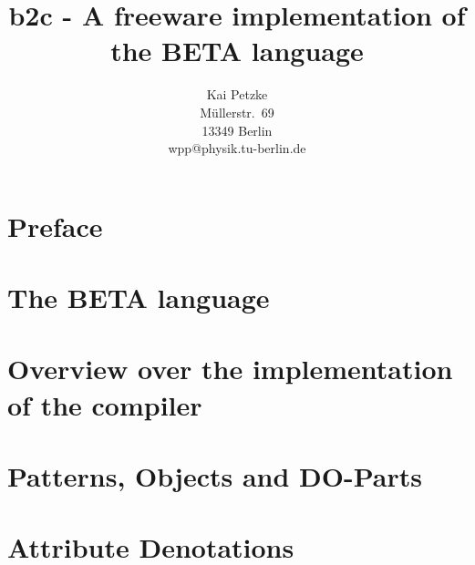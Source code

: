 

\title{b2c - A freeware implementation of the BETA language}
\author{Kai Petzke \\ M\"ullerstr.\ 69 \\ 13349 Berlin \\
        wpp@physik.tu-berlin.de}


\maketitle

\chapter*{Preface}


\chapter{The BETA language}


\chapter[Overview over the implementation]{Overview
over the implementation of the compiler}


\chapter{Patterns, Objects and DO-Parts}




\chapter{Attribute Denotations}




